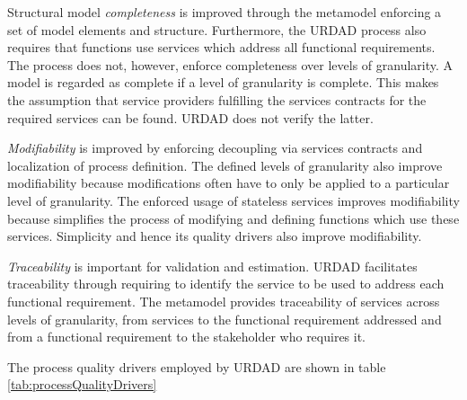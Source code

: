 Structural model \emph{completeness} is improved through the metamodel enforcing a set of model elements and structure. Furthermore, the URDAD process also requires that functions use services which address all functional requirements. The process does not, however, enforce completeness over levels of granularity. A model is regarded as complete if a level of granularity is complete. This makes the assumption that service providers fulfilling the services contracts for the required services can be found. URDAD does not verify the latter.

\emph{Modifiability} is improved by enforcing decoupling via services contracts and localization of process definition. The defined levels of granularity also improve modifiability because modifications often have to only be applied to a particular level of granularity. The enforced usage of stateless services improves modifiability because simplifies the process of modifying and defining functions which use these services. Simplicity and hence its quality drivers also improve modifiability.

\emph{Traceability} is important for validation and estimation. URDAD facilitates traceability through requiring to identify the service to be used to address each functional requirement. The metamodel provides traceability of services across levels of granularity,  from services to the functional requirement addressed and from a functional requirement to the stakeholder who requires it.

The process quality drivers employed by URDAD are shown in table \ref{tab:processQualityDrivers}

